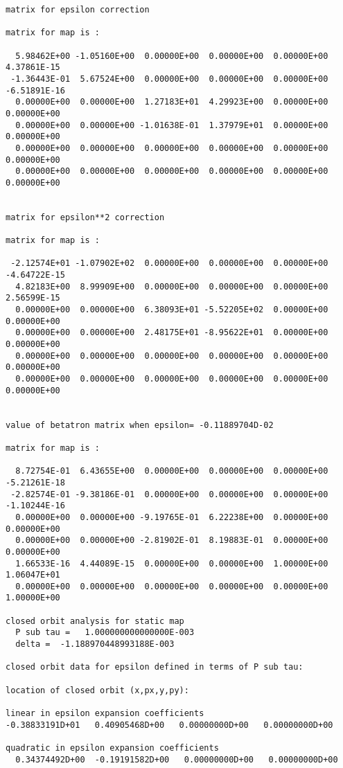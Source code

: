 \begin{footnotesize}
\begin{verbatim}
matrix for epsilon correction

matrix for map is :

  5.98462E+00 -1.05160E+00  0.00000E+00  0.00000E+00  0.00000E+00   4.37861E-15
 -1.36443E-01  5.67524E+00  0.00000E+00  0.00000E+00  0.00000E+00  -6.51891E-16
  0.00000E+00  0.00000E+00  1.27183E+01  4.29923E+00  0.00000E+00   0.00000E+00
  0.00000E+00  0.00000E+00 -1.01638E-01  1.37979E+01  0.00000E+00   0.00000E+00
  0.00000E+00  0.00000E+00  0.00000E+00  0.00000E+00  0.00000E+00   0.00000E+00
  0.00000E+00  0.00000E+00  0.00000E+00  0.00000E+00  0.00000E+00   0.00000E+00


matrix for epsilon**2 correction

matrix for map is :

 -2.12574E+01 -1.07902E+02  0.00000E+00  0.00000E+00  0.00000E+00  -4.64722E-15
  4.82183E+00  8.99909E+00  0.00000E+00  0.00000E+00  0.00000E+00   2.56599E-15
  0.00000E+00  0.00000E+00  6.38093E+01 -5.52205E+02  0.00000E+00   0.00000E+00
  0.00000E+00  0.00000E+00  2.48175E+01 -8.95622E+01  0.00000E+00   0.00000E+00
  0.00000E+00  0.00000E+00  0.00000E+00  0.00000E+00  0.00000E+00   0.00000E+00
  0.00000E+00  0.00000E+00  0.00000E+00  0.00000E+00  0.00000E+00   0.00000E+00


value of betatron matrix when epsilon= -0.11889704D-02

matrix for map is :

  8.72754E-01  6.43655E+00  0.00000E+00  0.00000E+00  0.00000E+00  -5.21261E-18
 -2.82574E-01 -9.38186E-01  0.00000E+00  0.00000E+00  0.00000E+00  -1.10244E-16
  0.00000E+00  0.00000E+00 -9.19765E-01  6.22238E+00  0.00000E+00   0.00000E+00
  0.00000E+00  0.00000E+00 -2.81902E-01  8.19883E-01  0.00000E+00   0.00000E+00
  1.66533E-16  4.44089E-15  0.00000E+00  0.00000E+00  1.00000E+00   1.06047E+01
  0.00000E+00  0.00000E+00  0.00000E+00  0.00000E+00  0.00000E+00   1.00000E+00

closed orbit analysis for static map
  P sub tau =   1.000000000000000E-003
  delta =  -1.188970448993188E-003

closed orbit data for epsilon defined in terms of P sub tau:

location of closed orbit (x,px,y,py):

linear in epsilon expansion coefficients
-0.38833191D+01   0.40905468D+00   0.00000000D+00   0.00000000D+00

quadratic in epsilon expansion coefficients
  0.34374492D+00  -0.19191582D+00   0.00000000D+00   0.00000000D+00


\end{verbatim}
\end{footnotesize}

